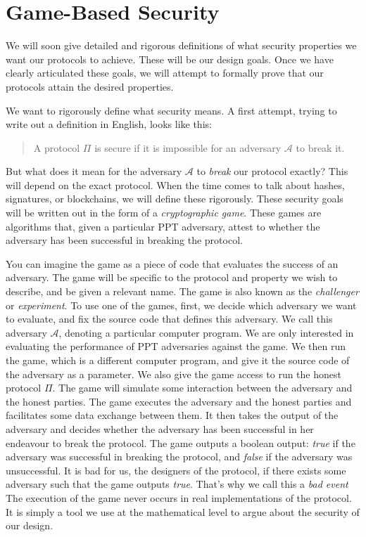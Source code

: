 \section{Game-Based Security}

We will soon give detailed and rigorous definitions of what security properties we want
our protocols to achieve. These will be our design goals. Once we have clearly articulated
these goals, we will attempt to formally prove that our protocols attain the desired properties.

We want to rigorously define what security means. A first attempt, trying to write out a definition
in English, looks like this:

\begin{quote}
  A protocol $\Pi$ is secure if it is impossible for an adversary $\mathcal{A}$ to
  break it.
\end{quote}

But what does it mean for the adversary $\mathcal{A}$ to \emph{break} our protocol exactly?
This will depend on the exact protocol. When the time comes to talk about hashes, signatures,
or blockchains, we will define these rigorously.
These security goals will be written out in the form of a \emph{cryptographic game}. These
games are algorithms that, given a particular PPT adversary, attest to whether the adversary
has been successful in breaking the protocol.

You can imagine the game as a piece of code that evaluates the success of an adversary.
The game will be specific to the protocol and property we wish to describe, and be given
a relevant name. The game is also known as the \emph{challenger} or \emph{experiment}.
To use one of the games, first,
we decide which adversary we want to evaluate, and fix the source code that defines this adversary.
We call this adversary
$\mathcal{A}$,
denoting a particular computer program.
We are only interested in evaluating the performance of PPT adversaries against the game.
We then run the
game, which is a different computer program, and give it the source code of the adversary as a
parameter. We also give the game access to run the honest protocol
$\Pi$.
The game will
simulate some interaction between the adversary and the honest parties. The game executes
the adversary and the honest parties and facilitates some data exchange between them. It
then takes the output of the adversary and decides whether the adversary has been successful
in her endeavour to break the protocol. The game outputs a boolean output: \emph{true}
if the adversary was successful in breaking the protocol, and \emph{false} if the adversary
was unsuccessful. It is bad for us, the designers of the protocol, if there exists some
adversary such that the game outputs \emph{true}. That's why we call this a \emph{bad event}
The execution of the game never occurs
in real implementations of the protocol. It is simply a tool we use at the mathematical
level to argue about the security of our design.


